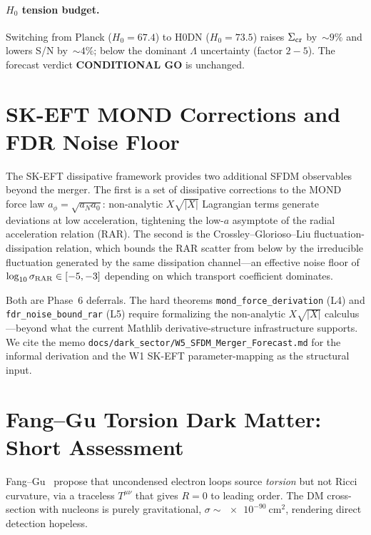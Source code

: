 \documentclass[aps,prd,twocolumn,showpacs,superscriptaddress,nofootinbib]{revtex4-2}
\begin{document}
\paragraph*{$H_0$ tension budget.}
Switching from Planck ($H_0 = 67.4$) to H0DN ($H_0 = 73.5$) raises
$\Sigma_{\rm cr}$ by~${\sim}9\%$ and lowers S/N by~${\sim}4\%$;
below the dominant $\Lambda$ uncertainty (factor $2{-}5$). The
forecast verdict \textbf{CONDITIONAL GO} is unchanged.

\section{SK-EFT MOND Corrections and FDR Noise Floor}
\label{sec:mond-fdr}

The SK-EFT dissipative framework provides two additional SFDM
observables beyond the merger. The first is a set of dissipative
corrections to the MOND force law $a_\phi = \sqrt{a_N a_0}$: non-analytic
$X\sqrt{|X|}$ Lagrangian terms generate deviations at low acceleration,
tightening the low-$a$ asymptote of the radial acceleration relation
(RAR). The second is the Crossley--Glorioso--Liu fluctuation-dissipation
relation, which bounds the RAR scatter from below by the irreducible
fluctuation generated by the same dissipation channel---an effective
noise floor of~$\log_{10}\sigma_{\rm RAR} \in [-5, -3]$ depending on
which transport coefficient dominates.

Both are Phase~6 deferrals. The hard theorems \texttt{mond\_force\_derivation}
(L4) and \texttt{fdr\_noise\_bound\_rar} (L5) require formalizing the
non-analytic $X\sqrt{|X|}$ calculus—beyond what the current Mathlib
derivative-structure infrastructure supports. We cite the memo
\texttt{docs/dark\_sector/W5\_SFDM\_Merger\_Forecast.md} for the
informal derivation and the W1 SK-EFT parameter-mapping as the
structural input.

\section{Fang--Gu Torsion Dark Matter: Short Assessment}
\label{sec:torsion}

Fang--Gu~\cite{FangGu2021} propose that uncondensed electron loops source
\emph{torsion} but not Ricci curvature, via a traceless $T^{\mu\nu}$
that gives $R = 0$ to leading order. The DM cross-section with nucleons
is purely gravitational, $\sigma \sim \SI{e-90}{\centi\meter\squared}$,
rendering direct detection hopeless.
\end{document}
